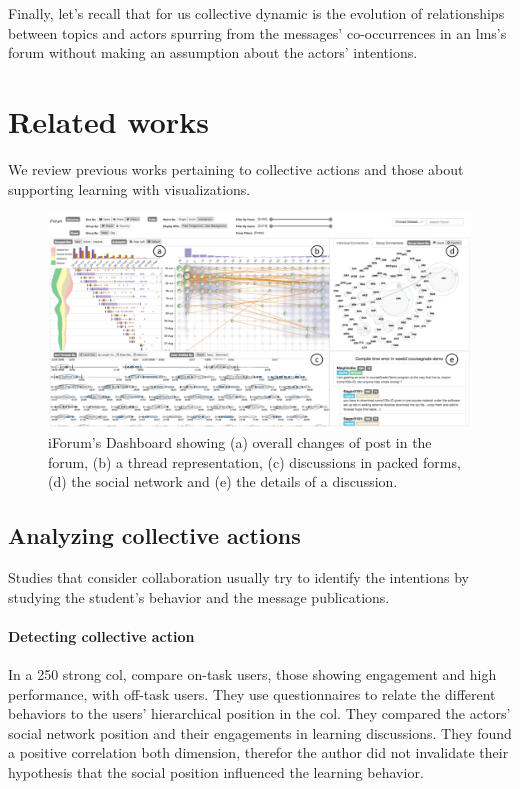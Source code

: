 \documentclass[a4paper,twoside]{article}
\begin{document}

Finally, let's recall that for us collective dynamic is the evolution of relationships between topics and actors spurring from the messages' co-occurrences in an \gls{lms}'s forum without making an assumption about the actors' intentions.

\section{Related works}
\label{section:3}
We review previous works pertaining to collective actions and those about supporting learning with visualizations.


\begin{figure}[b]
  \small{
    \caption{\label{fig:fu}
      iForum's Dashboard \citep{Fu2017} showing (a) overall changes of post in the forum, (b) a thread representation, (c) discussions in packed forms, (d) the social network and (e) the details of a discussion.
    }}
  \centering
  \includegraphics[width=.5\textwidth]{images/fu.png}
\end{figure}


\subsection{Analyzing collective actions}
Studies that consider collaboration usually try to identify the intentions by studying the student's behavior and the message publications.


\paragraph{Detecting collective action}  In a 250 strong \gls{col}, \cite{Rehm2015} compare on-task users, those showing engagement and high performance, with off-task users.  They use questionnaires to relate the different behaviors to the users' hierarchical position in the \gls{col}.  They compared the actors' social network position and their engagements in learning discussions.  They found a positive correlation both dimension, therefor the author did not invalidate their hypothesis that the social position influenced the learning behavior. %
\end{document}
